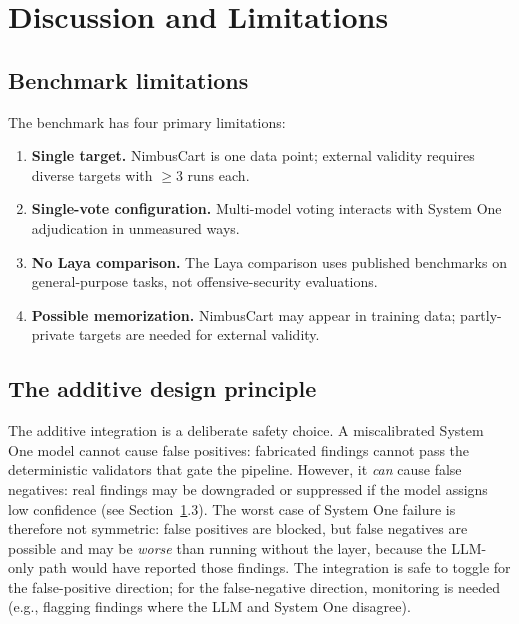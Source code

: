 \documentclass[conference]{IEEEtran}
\begin{document}
\section{Discussion and Limitations}\label{sec:discussion}

\subsection{Benchmark limitations}

The benchmark has four primary limitations:

\begin{enumerate}[leftmargin=*]
\item \textbf{Single target.} NimbusCart is one data point; external validity requires diverse targets with $\geq 3$ runs each.
\item \textbf{Single-vote configuration.} Multi-model voting interacts with System One adjudication in unmeasured ways.
\item \textbf{No Laya comparison.} The Laya comparison uses published benchmarks on general-purpose tasks, not offensive-security evaluations.
\item \textbf{Possible memorization.} NimbusCart may appear in training data; partly-private targets are needed for external validity.
\end{enumerate}

\subsection{The additive design principle}

The additive integration is a deliberate safety choice. A miscalibrated System One model cannot cause false positives: fabricated findings cannot pass the deterministic validators that gate the pipeline. However, it \emph{can} cause false negatives: real findings may be downgraded or suppressed if the model assigns low confidence (see Section~\ref{sec:discussion}.3). The worst case of System One failure is therefore not symmetric: false positives are blocked, but false negatives are possible and may be \emph{worse} than running without the layer, because the LLM-only path would have reported those findings. The integration is safe to toggle for the false-positive direction; for the false-negative direction, monitoring is needed (e.g., flagging findings where the LLM and System One disagree).
\end{document}
